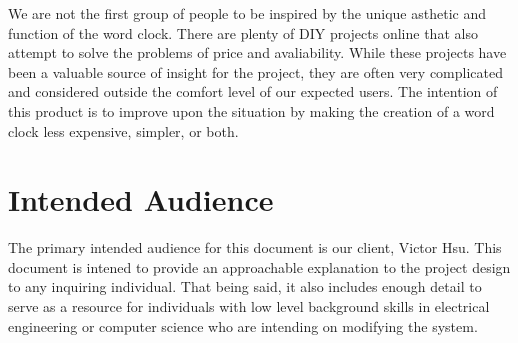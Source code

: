 \documentclass[10pt,draftclsnofoot,onecolumn]{IEEEtran}
\begin{document}
We are not the first group of people to be inspired by the unique asthetic and function of the word clock.
There are plenty of DIY projects online that also attempt to solve the problems of price and avaliability.
While these projects have been a valuable source of insight for the project, they are often very complicated and considered outside the comfort level of our expected users.
The intention of this product is to improve upon the situation by making the creation of a word clock less expensive, simpler, or both.

\section{Intended Audience}
The primary intended audience for this document is our client, Victor Hsu.
This document is intened to provide an approachable explanation to the project design to any inquiring individual.
That being said, it also includes enough detail to serve as a resource for individuals with low level background skills in electrical engineering or computer science who are intending on modifying the system.
\end{document}
